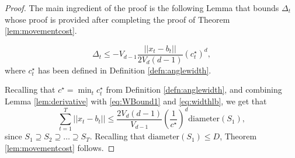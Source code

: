 \begin{proof}
The main ingredient of the proof is the following Lemma that bounds  $\Delta_t$ whose proof is provided after completing the proof of Theorem \ref{lem:movementcost}.
\begin{lemma}\label{lem:derivative} $$\Delta_t  \le -V_{d-1}\frac{||x_t-b_t||}{2V_d(d-1)}  (c_t^\star)^{d},$$
where $c_t^\star$ has been defined in Definition \ref{defn:anglewidth}.
\end{lemma}


Recalling that $c^\star = \min_t  c^\star_t$ from Definition \ref{defn:anglewidth}, and  combining  Lemma \ref{lem:derivative} with \eqref{eq:WBound1} and \eqref{eq:widthlb}, we get that 
$$\sum_{t=1}^T ||x_t-b_t|| \le \frac{2V_d(d-1)}{V_{d-1}} \left(\frac{1}{c^\star}\right)^{d}\text{diameter}(S_1),$$
since $S_1\supseteq S_2 \supseteq \dots \supseteq S_T$. Recalling that $\text{diameter}(S_1)\le D$, Theorem \ref{lem:movementcost} follows.
\end{proof}

